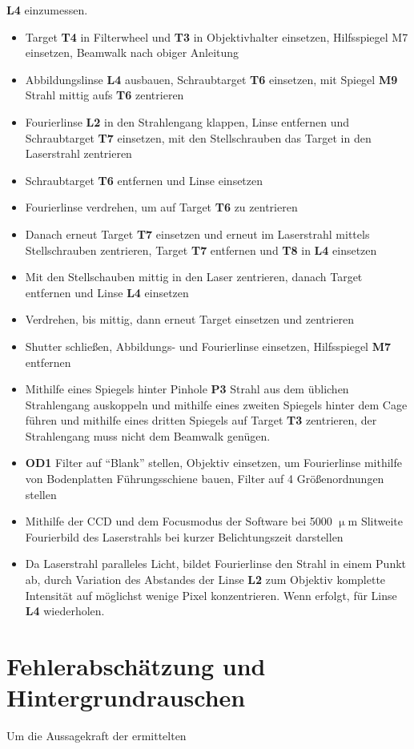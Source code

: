 \textbf{L4} einzumessen. \begin{itemize} \item Target \textbf{T4} in Filterwheel
und \textbf{T3} in Objektivhalter einsetzen, Hilfsspiegel M7 einsetzen, Beamwalk
nach obiger Anleitung \item Abbildungslinse \textbf{L4} ausbauen, Schraubtarget
\textbf{T6} einsetzen, mit Spiegel \textbf{M9} Strahl mittig aufs \textbf{T6}
zentrieren \item Fourierlinse \textbf{L2} in den Strahlengang klappen, Linse
entfernen und Schraubtarget \textbf{T7} einsetzen, mit den Stellschrauben  das
Target in den Laserstrahl zentrieren \item Schraubtarget \textbf{T6} entfernen
und Linse einsetzen \item Fourierlinse verdrehen, um auf Target \textbf{T6} zu
zentrieren \item Danach erneut Target \textbf{T7} einsetzen und erneut im
Laserstrahl mittels Stellschrauben zentrieren, Target \textbf{T7} entfernen und
\textbf{T8} in \textbf{L4} einsetzen \item Mit den Stellschauben mittig in den
Laser zentrieren, danach Target entfernen und Linse \textbf{L4} einsetzen \item
Verdrehen, bis mittig, dann erneut Target einsetzen und zentrieren \item Shutter
schließen, Abbildungs- und Fourierlinse einsetzen, Hilfsspiegel \textbf{M7}
entfernen \item  Mithilfe eines Spiegels hinter Pinhole \textbf{P3} Strahl aus
dem üblichen Strahlengang auskoppeln und mithilfe eines zweiten Spiegels hinter
dem Cage führen und mithilfe eines dritten Spiegels auf Target \textbf{T3}
zentrieren, der Strahlengang muss nicht dem Beamwalk genügen. \item \textbf{OD1}
Filter auf ``Blank'' stellen, Objektiv einsetzen, um Fourierlinse mithilfe von
Bodenplatten Führungsschiene bauen, Filter auf 4 Größenordnungen stellen \item
Mithilfe der CCD und dem Focusmodus der Software bei 5000 $\upmu$m Slitweite
Fourierbild des Laserstrahls bei kurzer Belichtungszeit darstellen \item Da
Laserstrahl paralleles Licht, bildet Fourierlinse den Strahl in einem Punkt ab,
durch Variation des Abstandes der Linse \textbf{L2} zum Objektiv komplette
Intensität auf möglichst wenige Pixel konzentrieren. Wenn erfolgt, für Linse
\textbf{L4} wiederholen. \end{itemize} \newpage \section{Fehlerabschätzung und
Hintergrundrauschen} \label{Fehler} Um die Aussagekraft der ermittelten
